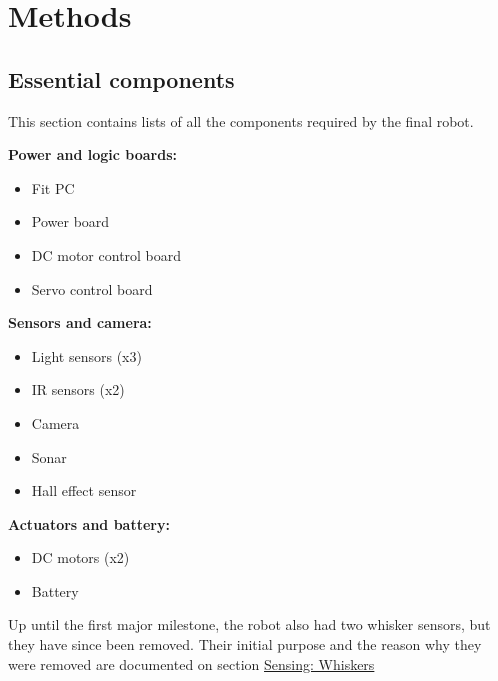 \section{Methods}

\subsection{Essential components}

This section contains lists of all the components required by the final robot.

\textbf{Power and logic boards:}
\begin{multicols}{3}
    \begin{itemize}
        \item Fit PC
        \item Power board
        \item DC motor control board
        \item Servo control board
    \end{itemize}
\end{multicols}

\textbf{Sensors and camera:}
\begin{multicols}{3}
    \begin{itemize}
        \item Light sensors (x3)
        \item IR sensors (x2)
        \item Camera
        \item Sonar
        \item Hall effect sensor
    \end{itemize}
\end{multicols}

\textbf{Actuators and battery:}
\begin{multicols}{3}
    \begin{itemize}
        \item DC motors (x2)
        \item Battery
    \end{itemize}
\end{multicols}

Up until the first major milestone, the robot also had two whisker sensors, but they have since been removed. Their initial purpose and the reason why they were removed are documented on section \hyperref[sec:whiskers]{Sensing: Whiskers}


